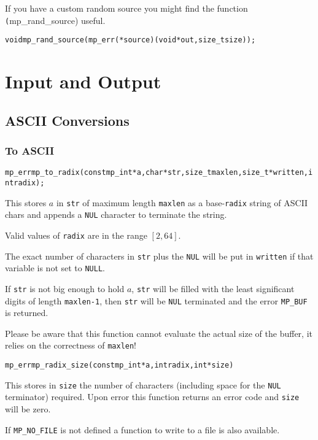 \documentclass[synpaper]{book}
\begin{document}
If you have a custom random source you might find the function \texttt(mp\_rand\_source) useful.
\begin{alltt}
void mp_rand_source(mp_err(*source)(void *out, size_t size));
\end{alltt}

\chapter{Input and Output}
\section{ASCII Conversions}
\subsection{To ASCII}
\begin{alltt}
mp_err mp_to_radix (const mp_int *a, char *str, size_t maxlen, size_t *written, int radix);
\end{alltt}
This stores $a$ in \texttt{str} of maximum length \texttt{maxlen} as a base-\texttt{radix} string
of ASCII chars and appends a \texttt{NUL} character to terminate the string.

Valid values of \texttt{radix} are in the range $[2, 64]$.

The exact number of characters in \texttt{str} plus the \texttt{NUL} will be put in
\texttt{written} if that variable is not set to \texttt{NULL}.

If \texttt{str} is not big enough to hold $a$, \texttt{str} will be filled with the least
significant digits of length \texttt{maxlen-1}, then \texttt{str} will be \texttt{NUL} terminated
and the error \texttt{MP\_BUF} is returned.

Please be aware that this function cannot evaluate the actual size of the buffer, it relies on the
correctness of \texttt{maxlen}!

\begin{alltt}
mp_err mp_radix_size (const mp_int *a, int radix, int *size)
\end{alltt}
This stores in \texttt{size} the number of characters (including space for the \texttt{NUL}
terminator) required. Upon error this function returns an error code and \texttt{size} will be
zero.

If \texttt{MP\_NO\_FILE} is not defined a function to write to a file is also available.
\end{document}

